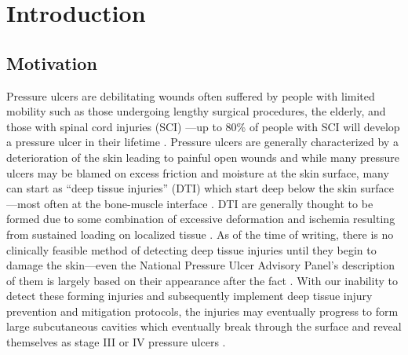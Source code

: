 \chapter{Introduction}
	\section{Motivation}
		Pressure ulcers are debilitating wounds often suffered by people with limited mobility such as those undergoing lengthy surgical procedures, the elderly, and those with spinal cord injuries (SCI) \cite{allman95}---up to \unit{80}{\%} of people with SCI will develop a pressure ulcer in their lifetime \cite{salzberg96}. Pressure ulcers are generally characterized by a deterioration of the skin leading to painful open wounds and while many pressure ulcers may be blamed on excess friction and moisture at the skin surface, many can start as ``deep tissue injuries'' (DTI) which start deep below the skin surface---most often at the bone-muscle interface \cite{kanno09}. DTI are generally thought to be formed due to some combination of excessive deformation and ischemia resulting from sustained loading on localized tissue \cite{stekelenburg08, gefen05, loerakker11}. As of the time of writing, there is no clinically feasible method of detecting deep tissue injuries until they begin to damage the skin---even the National Pressure Ulcer Advisory Panel's description of them is largely based on their appearance after the fact \cite{npuap07}. With our inability to detect these forming injuries and subsequently implement deep tissue injury prevention and mitigation protocols, the injuries may eventually progress to form large subcutaneous cavities which eventually break through the surface and reveal themselves as stage III or IV pressure ulcers \cite{bouten03,oomens10}.

